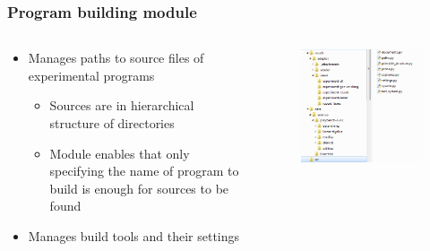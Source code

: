 \documentclass{beamer}
\begin{document}
\begin{frame}
\frametitle{Program building module}

	\begin{columns}[T]
		\begin{column}{0.5\textwidth}
			\begin{itemize}
				\item Manages paths to source files of experimental programs
				\begin{itemize}
					\item Sources are in hierarchical structure of directories
					\item Module enables that only specifying the name of program to build is enough for sources to be found
				\end{itemize}
				\item Manages build tools and their settings
			\end{itemize}
		\end{column}
		\begin{column}{0.5\textwidth}
			\begin{figure}
				\includegraphics[width=\textwidth]{source-tree}
			\end{figure}
		\end{column}
	\end{columns}

\end{frame}
\end{document}
